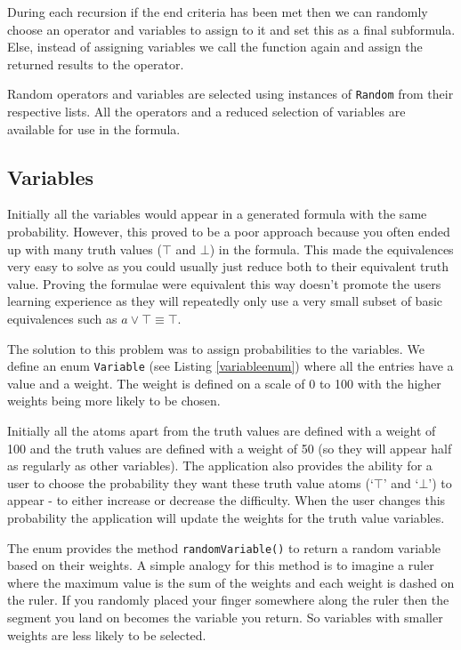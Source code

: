 \documentclass[draft]{report}
\begin{document}
During each recursion if the end criteria has been met then we can randomly choose an operator and variables to assign to it and set this as a final subformula. Else, instead of assigning variables we call the function again and assign the returned results to the operator.

Random operators and variables are selected using instances of {\tt Random} from their respective lists. All the operators and a reduced selection of variables are available for use in the formula.

\subsection{Variables}
\label{sub:variables}

Initially all the variables would appear in a generated formula with the same probability. However, this proved to be a poor approach because you often ended up with many truth values ($\top$ and $\bot$) in the formula. This made the equivalences very easy to solve as you could usually just reduce both to their equivalent truth value. Proving the formulae were equivalent this way doesn't promote the users learning experience as they will repeatedly only use a very small subset of basic equivalences such as $a\lor\top \equiv \top$.

The solution to this problem was to assign probabilities to the variables. We define an enum {\tt Variable} (see Listing \ref{variableenum}) where all the entries have a value and a weight. The weight is defined on a scale of 0 to 100 with the higher weights being more likely to be chosen.

Initially all the atoms apart from the truth values are defined with a weight of 100 and the truth values are defined with a weight of 50 (so they will appear half as regularly as other variables). The application also provides the ability for a user to choose the probability they want these truth value atoms (`$\top$' and `$\bot$') to appear - to either increase or decrease the difficulty. When the user changes this probability the application will update the weights for the truth value variables.

The enum provides the method {\tt randomVariable()} to return a random variable based on their weights. A simple analogy for this method is to imagine a ruler where the maximum value is the sum of the weights and each weight is dashed on the ruler. If you randomly placed your finger somewhere along the ruler then the segment you land on becomes the variable you return. So variables with smaller weights are less likely to be selected.
\end{document}
